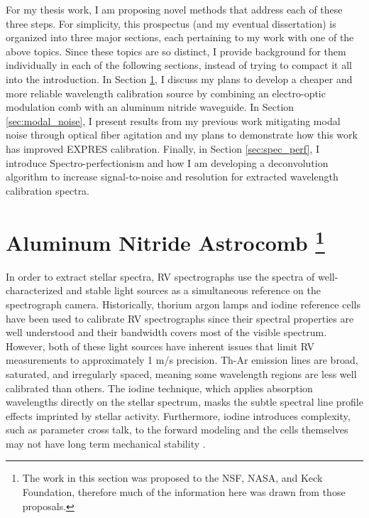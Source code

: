 \documentclass[11pt]{article}
\begin{document}
For my thesis work, I am proposing novel methods that address each of these three steps. For simplicity, this prospectus (and my eventual dissertation) is organized into three major sections, each pertaining to my work with one of the above topics. Since these topics are so distinct, I provide background for them individually in each of the following sections, instead of trying to compact it all into the introduction. In Section \ref{sec:astrocomb}, I discuss my plans to develop a cheaper and more reliable wavelength calibration source by combining an electro-optic modulation comb with an aluminum nitride waveguide. In Section \ref{sec:modal_noise}, I present results from my previous work mitigating modal noise through optical fiber agitation and my plans to demonstrate how this work has improved EXPRES calibration. Finally, in Section \ref{sec:spec_perf}, I introduce Spectro-perfectionism and how I am developing a deconvolution algorithm to increase signal-to-noise and resolution for extracted wavelength calibration spectra.

\section{Aluminum Nitride Astrocomb \footnote{The work in this section was proposed to the NSF, NASA, and Keck Foundation, therefore much of the information here was drawn from those proposals.}}
\label{sec:astrocomb}

In order to extract stellar spectra, RV spectrographs use the spectra of well-characterized and stable light sources as a simultaneous reference on the spectrograph camera. Historically, thorium argon lamps and iodine reference cells have been used to calibrate RV spectrographs since their spectral properties are well understood and their bandwidth covers most of the visible spectrum. However, both of these light sources have inherent issues that limit RV measurements to approximately 1 m/s precision. Th-Ar emission lines are broad, saturated, and irregularly spaced, meaning some wavelength regions are less well calibrated than others. The iodine technique, which applies absorption wavelengths directly on the stellar spectrum, masks the subtle spectral line profile effects imprinted by stellar activity. Furthermore, iodine introduces complexity, such as parameter cross talk, to the forward modeling \citep{Spronck2015} and the cells themselves may not have long term mechanical stability \citep{Fischer2014a}.
\end{document}
